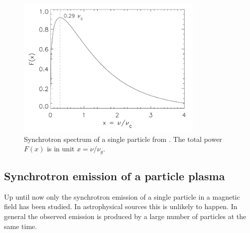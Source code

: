 \documentclass[../main.tex]{subfiles}
\begin{document}
\begin{figure}
\centering
\includegraphics[width=0.8\textwidth]{images/sync_spectrum.png} 
\caption[]{Synchrotron spectrum of a single particle from \citet{Beckmann12}. The total power $F(x)$ is in unit $x=\nu/\nu_g$. }
\label{fig:sunc_spectrum}
\end{figure}

\subsection{Synchrotron emission of a particle plasma}

Up until now only the synchrotron emission of a single particle in a magnetic field has been studied.
In astrophysical sources this is unlikely to happen.
In general the observed emission is produced by a large number of particles at the same time.
\end{document}
